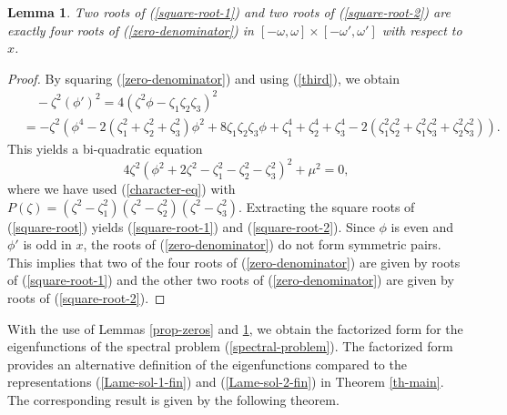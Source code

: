 \documentclass[12pt,reqno]{amsart}
\numberwithin{equation}{section}
\newtheorem{lemma}{Lemma}
\begin{document}
\begin{lemma}
	\label{prop-zeros-2} 
	Two roots of (\ref{square-root-1}) and two roots of (\ref{square-root-2}) are exactly four roots of (\ref{zero-denominator}) in $[-\omega,\omega] \times [-\omega',\omega']$ with respect to $x$.
\end{lemma}

\begin{proof}
By squaring (\ref{zero-denominator}) and using (\ref{third}), we obtain 
\begin{align*}
& \quad -\zeta^2 (\phi')^2 = 4 (\zeta^2 \phi - \zeta_1 \zeta_2 \zeta_3)^2 \\
&= -\zeta^2 (\phi^4 -2 (\zeta_1^2 + \zeta_2^2 + \zeta_3^2) \phi^2 + 8 \zeta_1 \zeta_2 \zeta_3 \phi + \zeta_1^4 + \zeta_2^4 + \zeta_3^4 - 2(\zeta_1^2 \zeta_2^2 + \zeta_1^2 \zeta_3^2 + \zeta_2^2 \zeta_3^2)).
\end{align*}
This yields a bi-quadratic equation 
\begin{equation}
\label{square-root}
4 \zeta^2 \left( \phi^2 + 2 \zeta^2 - \zeta_1^2 - \zeta_2^2 - \zeta_3^2 \right)^2 + \mu^2 = 0,
\end{equation}
where we have used (\ref{character-eq}) with $P(\zeta) = (\zeta^2 - \zeta_1^2)(\zeta^2 - \zeta_2^2)(\zeta^2 - \zeta_3^2)$. Extracting the square roots of (\ref{square-root}) yields (\ref{square-root-1}) and (\ref{square-root-2}). 
Since $\phi$ is even and $\phi'$ is odd in $x$, the roots of (\ref{zero-denominator}) do not form symmetric pairs. This implies that 
two of the four roots of (\ref{zero-denominator}) are given by roots 
of (\ref{square-root-1}) and the other two roots of (\ref{zero-denominator}) are given by roots of (\ref{square-root-2}). 
\end{proof}

With the use of Lemmas \ref{prop-zeros} and \ref{prop-zeros-2}, we obtain the factorized form for the eigenfunctions of the spectral problem (\ref{spectral-problem}). The factorized form provides an alternative 
definition of the eigenfunctions compared to the representations 
(\ref{Lame-sol-1-fin}) and (\ref{Lame-sol-2-fin}) in Theorem \ref{th-main}. 
The corresponding result is given by the following theorem. 
\end{document}
